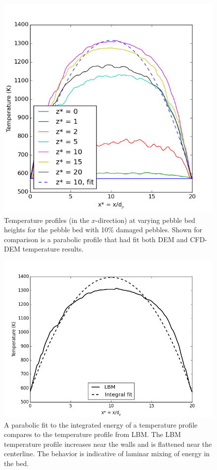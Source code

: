 \begin{figure}[t]
    \centering
    \includegraphics[width=\singleimagewidth]{figures/lbm/lbm-temp-profiles}
    \caption{Temperature profiles (in the $x$-direction) at varying pebble bed heights for the pebble bed with 10\% damaged pebbles. Shown for comparison is a parabolic profile that had fit both DEM and CFD-DEM temperature results.}\label{fig:lbm-temp-profiles}
\end{figure}

\begin{figure}[t]
    \centering
    \includegraphics[width=\singleimagewidth]{figures/lbm/lbm-temp-profile_parabolic}
    \caption{A parabolic fit to the integrated energy of a temperature profile compares to the temperature profile from LBM. The LBM temperature profile increases near the walls and is flattened near the centerline. The behavior is indicative of laminar mixing of energy in the bed.}\label{fig:lbm-temp-parabolas}
\end{figure}

